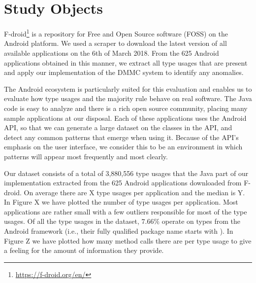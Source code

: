 \section{Study Objects} 

F-droid\footnote{\url{https://f-droid.org/en/}} is a repository for Free and Open Source software (FOSS) on the Android platform.
We used a scraper to download the latest version of all available applications on the 6th of March 2018.
From the 625 Android applications obtained in this manner, we extract all type usages that are present and apply our implementation of the $\text{DMMC}$ system to identify any anomalies.

The Android ecosystem is particularly suited for this evaluation and enables us to evaluate how type usages and the majority rule behave on real software.
The Java code is easy to analyze and there is a rich open source community, placing many sample applications at our disposal.
Each of these applications uses the Android API, so that we can generate a large dataset on the classes in the API, and detect any common patterns that emerge when using it.
Because of the API's emphasis on the user interface, we consider this to be an environment in which patterns will appear most frequently and most clearly.

Our dataset consists of a total of 3,880,556 type usages that the Java part of our implementation extracted from the 625 Android applications downloaded from F-droid.
On average there are X type usages per application and the median is Y.
In Figure X we have plotted the number of type usages per application.
Most applications are rather small with a few outliers responsible for most of the type usages.
Of all the type usages in the dataset, $7.66\%$ operate on types from the Android framework (i.e., their fully qualified package name starts with ).
In Figure Z we have plotted how many method calls there are per type usage to give a feeling for the amount of information they provide.

